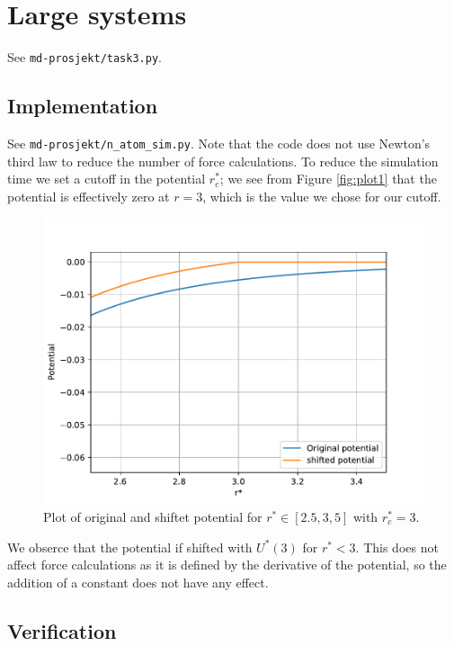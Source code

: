 \documentclass[a4paper,10pt,english]{article}
\begin{document}
\newpage

\section{Large systems} \label{3}

See \verb|md-prosjekt/task3.py|.

\subsection{Implementation} \label{3a}
See \verb|md-prosjekt/n_atom_sim.py|. Note that the code does not use Newton's third law to reduce the number of force calculations. To reduce the simulation time we set a cutoff in the potential $r_c^*$; we see from Figure \ref{fig:plot1} that the potential is effectively zero at $r=3$, which is the value we chose for our cutoff.

\begin{figure} [h!]
    \centering
    \includegraphics[scale=0.65]{../figures/3_a_iv.pdf}
    \caption{Plot of original and shiftet potential for $r^* \in [2.5, 3,5]$ with $r_c^* = 3$.}
    \label{fig:shiftedpotential}
\end{figure}

We obserce that the potential if shifted with $U^*(3)$ for $r^*<3$. This does not affect force calculations as it is defined by the derivative of the potential, so the addition of a constant does not have any effect.

\newpage

\subsection{Verification} \label{3b}
\end{document}
